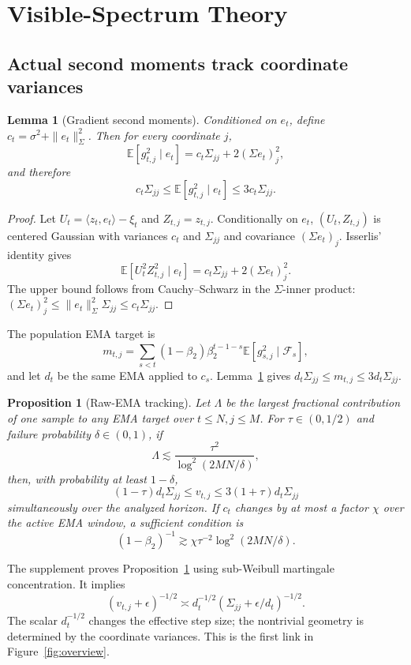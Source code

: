 \documentclass[letterpaper]{article} %
\newtheorem{proposition}{Proposition}
\newtheorem{lemma}{Lemma}
\newcommand{\E}{\mathbb{E}}
\begin{document}
\section{Visible-Spectrum Theory}

\subsection{Actual second moments track coordinate variances}

\begin{lemma}[Gradient second moments]
\label{lem:second-moment}
Conditioned on $e_t$, define $c_t=\sigma^2+\|e_t\|_\Sigma^2$.  Then for every coordinate $j$,
\[
 \E[g_{t,j}^2\mid e_t]=c_t\Sigma_{jj}+2(\Sigma e_t)_j^2,
\]
and therefore
\[
 c_t\Sigma_{jj}\le \E[g_{t,j}^2\mid e_t]\le3c_t\Sigma_{jj}.
\]
\end{lemma}

\begin{proof}
Let $U_t=\langle z_t,e_t\rangle-\xi_t$ and $Z_{t,j}=z_{t,j}$.  Conditionally on $e_t$, $(U_t,Z_{t,j})$ is centered Gaussian with variances $c_t$ and $\Sigma_{jj}$ and covariance $(\Sigma e_t)_j$.  Isserlis' identity gives
\[
 \E[U_t^2Z_{t,j}^2\mid e_t]
 =c_t\Sigma_{jj}+2(\Sigma e_t)_j^2.
\]
The upper bound follows from Cauchy--Schwarz in the $\Sigma$-inner product:
$(\Sigma e_t)_j^2\le\|e_t\|_\Sigma^2\Sigma_{jj}\le c_t\Sigma_{jj}$.
\end{proof}

The population EMA target is
\[
 m_{t,j}=\sum_{s<t}(1-\beta_2)\beta_2^{t-1-s}
 \E[g_{s,j}^2\mid\mathcal F_s],
\]
and let $d_t$ be the same EMA applied to $c_s$.  Lemma~\ref{lem:second-moment} gives
$d_t\Sigma_{jj}\le m_{t,j}\le3d_t\Sigma_{jj}$.

\begin{proposition}[Raw-EMA tracking]
\label{prop:ema}
Let $\Lambda$ be the largest fractional contribution of one sample to any EMA target over $t\le N,j\le M$.  For $\tau\in(0,1/2)$ and failure probability $\delta\in(0,1)$, if
\[
 \Lambda\lesssim \frac{\tau^2}{\log^2(2MN/\delta)},
\]
then, with probability at least $1-\delta$,
\[
 (1-\tau)d_t\Sigma_{jj}
 \le v_{t,j}\le
 3(1+\tau)d_t\Sigma_{jj}
\]
simultaneously over the analyzed horizon.  If $c_t$ changes by at most a factor $\chi$ over the active EMA window, a sufficient condition is
\[
 (1-\beta_2)^{-1}
 \gtrsim \chi\tau^{-2}\log^2(2MN/\delta).
\]
\end{proposition}

The supplement proves Proposition~\ref{prop:ema} using sub-Weibull martingale concentration.  It implies
\[
 (v_{t,j}+\epsilon)^{-1/2}
 \asymp d_t^{-1/2}(\Sigma_{jj}+\epsilon/d_t)^{-1/2}.
\]
The scalar $d_t^{-1/2}$ changes the effective step size; the nontrivial geometry is determined by the coordinate variances.  This is the first link in Figure~\ref{fig:overview}.
\end{document}

